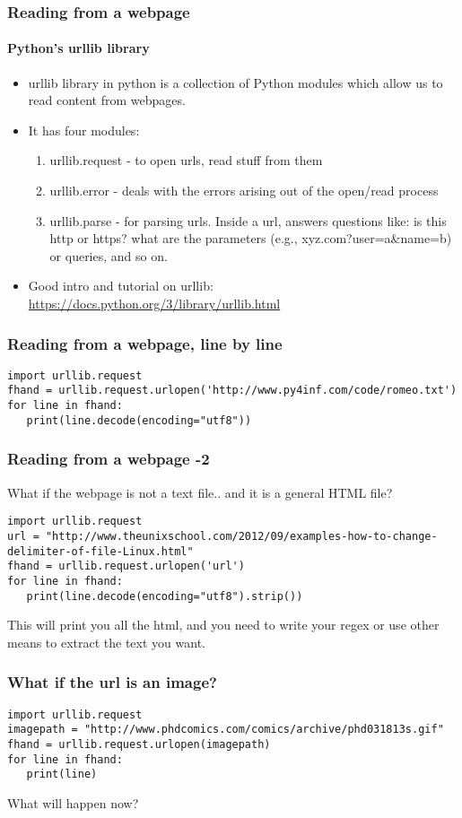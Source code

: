 \documentclass{beamer}
\begin{document}
\begin{frame}
\frametitle{Reading from a webpage}
\framesubtitle{Python's urllib library}
\begin{itemize}
\item urllib library in python is a collection of Python modules which allow us to read content from webpages.
\item It has four modules: 
\begin{enumerate}
\item urllib.request - to open urls, read stuff from them
\item urllib.error - deals with the errors arising out of the open/read process
\item urllib.parse - for parsing urls. Inside a url, answers questions like: is this http or https? what are the parameters (e.g., xyz.com?user=a\&name=b) or queries, and so on. 
\end{enumerate}
\item Good intro and tutorial on urllib: \url{https://docs.python.org/3/library/urllib.html}
\end{itemize}
\end{frame}

\begin{frame}[fragile]
\frametitle{Reading from a webpage, line by line}
\footnotesize
\begin{verbatim}
import urllib.request
fhand = urllib.request.urlopen('http://www.py4inf.com/code/romeo.txt')
for line in fhand:
   print(line.decode(encoding="utf8"))
\end{verbatim}
\end{frame}

\begin{frame}[fragile]
\frametitle{Reading from a webpage -2}
What if the webpage is not a text file.. and it is a general HTML file?
\tiny
\begin{verbatim}
import urllib.request
url = "http://www.theunixschool.com/2012/09/examples-how-to-change-delimiter-of-file-Linux.html"
fhand = urllib.request.urlopen('url')
for line in fhand:
   print(line.decode(encoding="utf8").strip())
\end{verbatim}
\normalsize This will print you all the html, and you need to write your regex or use other means to extract the text you want.
\end{frame}

\begin{frame}[fragile]
\frametitle{What if the url is an image?}
\scriptsize
\begin{verbatim}
import urllib.request
imagepath = "http://www.phdcomics.com/comics/archive/phd031813s.gif"
fhand = urllib.request.urlopen(imagepath)
for line in fhand:
   print(line)
\end{verbatim}
What will happen now?
\end{frame}
\end{document}
